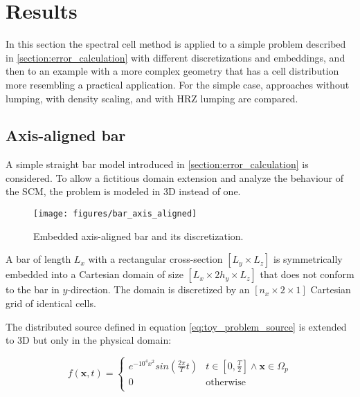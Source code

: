 %
\section{Results}
\label{section:results}
%

In this section the spectral cell method is applied to a simple problem described in \ref{section:error_calculation} with different discretizations and embeddings, and then to an example with a more complex geometry that has a cell distribution more resembling a practical application. For the simple case, approaches without lumping, with density scaling, and with HRZ lumping are compared.

%
\subsection{Axis-aligned bar}
\label{section:axis_aligned_bar}
%

A simple straight bar model introduced in \ref{section:error_calculation} is considered. To allow a fictitious domain extension and analyze the behaviour of the SCM, the problem is modeled in 3D instead of one.

\begin{figure}[!h]
	\centering
	\texttt{[image: figures/bar\_axis\_aligned]}
	\caption{Embedded axis-aligned bar and its discretization.}
	\label{fig:bar_axis_aligned}
\end{figure}

A bar of length $L_x$ with a rectangular cross-section $[L_y \times L_z]$ is symmetrically embedded into a Cartesian domain of size $[L_x \times 2h_y \times L_z]$ that does not conform to the bar in $y$-direction. The domain is discretized by an $[n_x \times 2 \times 1]$ Cartesian grid of identical cells.

The distributed source defined in equation \ref{eq:toy_problem_source} is extended to 3D but only in the physical domain:

\begin{equation} \label{eq:axis_aligned_source}
	f(\mathbf x,t) = \begin{cases}
	e^{-10^4x^2} sin \left( \frac{2 \pi}{T} t \right) & t \in \left[ 0,\frac{T}{2} \right] \land \mathbf x \in \Omega_p \\[0.5em]
	0 & \text{otherwise} \\
	\end{cases}
\end{equation}

